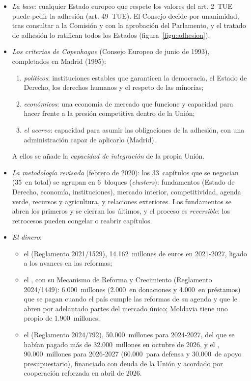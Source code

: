\documentclass[11pt]{article}
\begin{document}
\begin{itemize}
\item \emph{La base}: cualquier Estado europeo que respete los valores del art. 2~TUE puede pedir la adhesión (art. 49~TUE). El Consejo decide por unanimidad, tras consultar a la Comisión y con la aprobación del Parlamento, y el tratado de adhesión lo ratifican todos los Estados (figura~\ref{figu:adhesion}).
\item \emph{Los criterios de Copenhague} (Consejo Europeo de junio de 1993), completados en Madrid (1995):
  \begin{enumerate}
  \item \emph{políticos}: instituciones estables que garanticen la democracia, el Estado de Derecho, los derechos humanos y el respeto de las minorías;
  \item \emph{económicos}: una economía de mercado que funcione y capacidad para hacer frente a la presión competitiva dentro de la Unión;
  \item \emph{el acervo}: capacidad para asumir las obligaciones de la adhesión, con una administración capaz de aplicarlo (Madrid).
  \end{enumerate}
  A ellos se añade la \emph{capacidad de integración} de la propia Unión.
\item \emph{La metodología revisada} (febrero de 2020)\nocite{CE2020Metodologia}: los 33~capítulos que se negocian (35~en total) se agrupan en 6~bloques (\emph{clusters}): fundamentos (Estado de Derecho, economía, instituciones), mercado interior, competitividad, agenda verde, recursos y agricultura, y relaciones exteriores. Los fundamentos se abren los primeros y se cierran los últimos, y el proceso es \emph{reversible}: los retrocesos pueden congelar o reabrir capítulos.
\item \emph{El dinero}:
  \begin{itemize}
  \item el  (Reglamento 2021/1529), 14.162~millones de euros en 2021-2027, ligado a los avances en las reformas\nocite{UE2021IPA};
  \item el , con su Mecanismo de Reforma y Crecimiento (Reglamento 2024/1449): 6.000~millones (2.000~en donaciones y 4.000~en préstamos) que se pagan cuando el país cumple las reformas de su agenda y que le abren por adelantado partes del mercado único; Moldavia tiene uno propio de 1.900~millones\nocite{CE2026PaqueteAmpliacion};
  \item el  (Reglamento 2024/792), 50.000~millones para 2024-2027, del que se habían pagado más de 32.000~millones en octubre de 2026\nocite{CE2026UcraniaDesembolso}, y el , 90.000~millones para 2026-2027 (60.000~para defensa y 30.000~de apoyo presupuestario), financiado con deuda de la Unión y acordado por cooperación reforzada en abril de 2026\nocite{CE2026PrestamoUcrania}.

\end{itemize}
\end{itemize}
\end{document}

